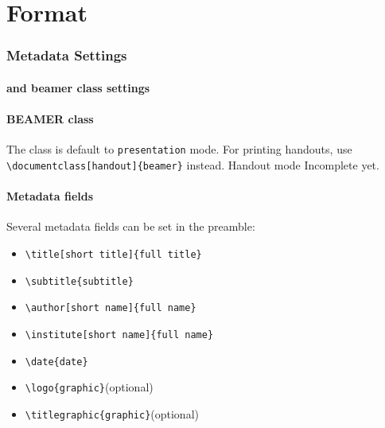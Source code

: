 \section{Format} 

\begin{frame}
  \frametitle{Metadata Settings}
  \framesubtitle{and beamer class settings}
  
  \paragraph{BEAMER class}
  The class is default to \Verb|presentation| mode. 
  For printing handouts, use \Verb|\documentclass[handout]{beamer}| instead. 
  \alert{Handout mode Incomplete yet.}

  \paragraph{Metadata fields}
  Several metadata fields can be set in the preamble:
  \begin{itemize}
    \item \Verb|\title[short title]{full title}|
    \item \Verb|\subtitle{subtitle}|
    \item \Verb|\author[short name]{full name}|
    \item \Verb|\institute[short name]{full name}|
    \item \Verb|\date{date}|
    \item \Verb|\logo{graphic}|\hspace{3em}(optional)
    \item \Verb|\titlegraphic{graphic}|\hspace{3em}(optional)
  \end{itemize}
\end{frame}

